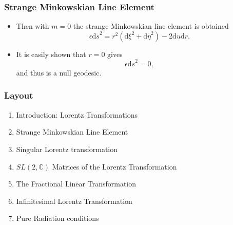 \documentclass[10pt,a4paper]{beamer}
\begin{document}
\begin{frame}
\frametitle{Strange Minkowskian Line Element}
\begin{itemize}
\item<1->{Then with $m = 0$ the strange Minkowskian line element is obtained $$\epsilon {\mathrm{d}s}^2 = r^2 ({\mathrm{d}\xi}^2 + {\mathrm{d}\eta}^2) - 2 {\mathrm{d}u}{\mathrm{d}r}.$$}
\item<2->{It is easily shown that $r = 0$ gives $$\epsilon {\mathrm{d}s}^2 = 0,$$ and thus is a null geodesic.}
\end{itemize}
\end{frame}

\begin{frame}
\frametitle{Layout}
\begin{enumerate}
\item<1>{Introduction: Lorentz Transformations}
\item<1>{Strange Minkowskian Line Element}
\item<1>{Singular Lorentz transformation}
\item<0>{$SL(2,\mathbb{C})$ Matrices of the Lorentz Transformation}
\item<0>{The Fractional Linear Transformation}
\item<0>{Infinitesimal Lorentz Transformation}
\item<0>{Pure Radiation conditions}
\end{enumerate}
\end{frame}

\end{document}

